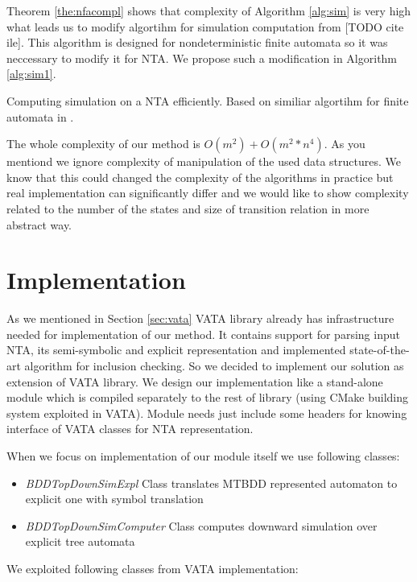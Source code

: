 \documentclass[a4paper, 12pt]{article}
\begin{document}
Theorem \ref{the:nfacompl} shows that complexity of Algorithm \ref{alg:sim} is very high what leads us
to modify algortihm for simulation computation from [TODO cite ile].
This algorithm is designed for nondeterministic finite automata so it was neccessary to modify it for NTA.
We propose such a modification in Algorithm \ref{alg:sim1}.

\begin{algorithm}[h]
\label{alg:sim1}
	
	 \caption{Computing simulation on a NTA efficiently. Based on similiar algortihm for finite automata in \cite{ilie:nfa}.}
\end{algorithm}

The whole complexity of our method is $O(m^2)+O(m^2*n^4)$. As you mentiond we ignore complexity of
manipulation of the used data structures.
We know that this could changed the complexity of the algorithms in practice but real implementation can significantly differ
and we would like to show complexity related to the number of the states and size of transition relation in more abstract way.

\section{Implementation}
\label{sec:impl}

As we mentioned in Section \ref{sec:vata} VATA library already has infrastructure needed for implementation of
our method.
It contains support for parsing input NTA, its semi-symbolic and explicit representation and implemented
state-of-the-art algorithm for inclusion checking.
So we decided to implement our solution as extension of VATA library.
We design our implementation like a stand-alone module which is compiled separately to the rest of library (using CMake building system exploited in VATA).
Module needs just include some headers for knowing interface of VATA classes for NTA representation.

When we focus on implementation of our module itself we use following classes:
\begin{itemize}
	\item \emph{BDDTopDownSimExpl} Class translates MTBDD represented automaton to explicit one with symbol translation
	\item \emph{BDDTopDownSimComputer} Class computes downward simulation over explicit tree automata
\end{itemize}

We exploited following classes from VATA implementation:
\end{document}
